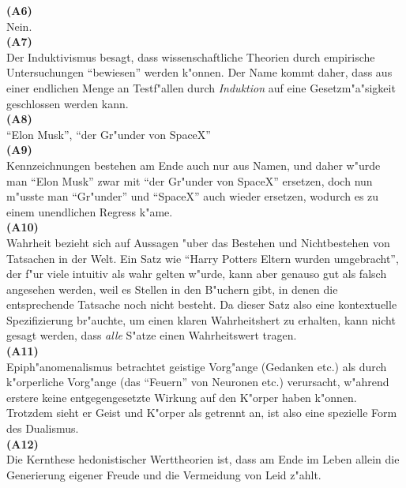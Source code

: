 \documentclass[a4paper]{article}
\begin{document}
\noindent\textbf{(A6)}\\
\noindent Nein.\\

\noindent\textbf{(A7)}\\
\noindent Der Induktivismus besagt, dass wissenschaftliche Theorien durch empirische Untersuchungen "`bewiesen"' werden k"onnen. Der Name kommt daher, dass aus einer endlichen Menge an Testf"allen durch \emph{Induktion} auf eine Gesetzm"a"sigkeit geschlossen werden kann.\\

\noindent\textbf{(A8)}\\
\noindent "`Elon Musk"', "`der Gr"under von SpaceX"'\\

\noindent\textbf{(A9)}\\
\noindent Kennzeichnungen bestehen am Ende auch nur aus Namen, und daher w"urde man "`Elon Musk"' zwar mit "`der Gr"under von SpaceX"' ersetzen, doch nun m"usste man "`Gr"under"' und "`SpaceX"' auch wieder ersetzen, wodurch es zu einem unendlichen Regress k"ame.\\

\noindent\textbf{(A10)}\\
\noindent Wahrheit bezieht sich auf Aussagen "uber das Bestehen und Nichtbestehen von Tatsachen in der Welt. Ein Satz wie  "`Harry Potters Eltern wurden umgebracht"', der f"ur viele intuitiv als wahr gelten w"urde, kann aber genauso gut als falsch angesehen werden, weil es Stellen in den B"uchern gibt, in denen die entsprechende Tatsache noch nicht besteht. Da dieser Satz also eine kontextuelle Spezifizierung br"auchte, um einen klaren Wahrheitshert zu erhalten, kann nicht gesagt werden, dass \emph{alle} S"atze einen Wahrheitswert tragen.\\

\noindent\textbf{(A11)}\\
\noindent Epiph"anomenalismus betrachtet geistige Vorg"ange (Gedanken etc.) als durch k"orperliche Vorg"ange (das "`Feuern"' von Neuronen etc.) verursacht, w"ahrend erstere keine entgegengesetzte Wirkung auf den K"orper haben k"onnen. Trotzdem sieht er Geist und K"orper als getrennt an, ist also eine spezielle Form des Dualismus.\\

\noindent\textbf{(A12)}\\
\noindent Die Kernthese hedonistischer Werttheorien ist, dass am Ende im Leben allein die Generierung eigener Freude und die Vermeidung von Leid z"ahlt. \\
\end{document}
